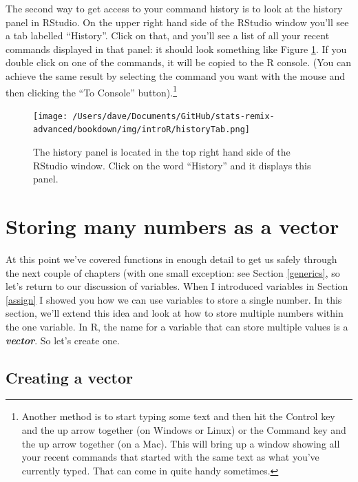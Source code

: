 \documentclass[
]{book}
\begin{document}
The second way to get access to your command history is to look at the history panel in RStudio. On the upper right hand side of the RStudio window you'll see a tab labelled ``History''. Click on that, and you'll see a list of all your recent commands displayed in that panel: it should look something like Figure \ref{fig:RStudiohistory}. If you double click on one of the commands, it will be copied to the R console. (You can achieve the same result by selecting the command you want with the mouse and then clicking the ``To Console'' button).\footnote{Another method is to start typing some text and then hit the Control key and the up arrow together (on Windows or Linux) or the Command key and the up arrow together (on a Mac). This will bring up a window showing all your recent commands that started with the same text as what you've currently typed. That can come in quite handy sometimes.}

\begin{figure}
\centering
\texttt{[image: /Users/dave/Documents/GitHub/stats-remix-advanced/bookdown/img/introR/historyTab.png]}
\caption{\label{fig:RStudiohistory}The history panel is located in the top right hand side of the RStudio window. Click on the word ``History'' and it displays this panel.}
\end{figure}

\hypertarget{vectors}{%
\section{Storing many numbers as a vector}\label{vectors}}

At this point we've covered functions in enough detail to get us safely through the next couple of chapters (with one small exception: see Section \ref{generics}, so let's return to our discussion of variables. When I introduced variables in Section \ref{assign} I showed you how we can use variables to store a single number. In this section, we'll extend this idea and look at how to store multiple numbers within the one variable. In R, the name for a variable that can store multiple values is a \textbf{\emph{vector}}. So let's create one.

\hypertarget{creating-a-vector}{%
\subsection{Creating a vector}\label{creating-a-vector}}
\end{document}
